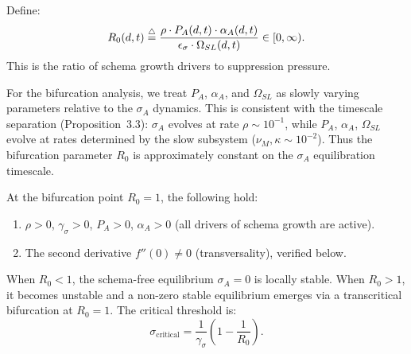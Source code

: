 
\begin{definition}
Define:
\[
R_0(d,t) \stackrel{\triangle}{=} \frac{\rho \cdot P_A(d,t) \cdot \alpha_A(d,t)}
{\epsilon_\sigma \cdot \Omega_{SL}(d,t)} \in [0, \infty).
\]
This is the ratio of schema growth drivers to suppression pressure.
\end{definition}

\begin{assumption}
For the bifurcation analysis, we treat $P_A$, $\alpha_A$, and $\Omega_{SL}$
as slowly varying parameters relative to the $\sigma_A$ dynamics. This is
consistent with the timescale separation (Proposition~3.3): $\sigma_A$
evolves at rate $\rho \sim 10^{-1}$, while $P_A$, $\alpha_A$, $\Omega_{SL}$
evolve at rates determined by the slow subsystem ($\nu_M, \kappa \sim 10^{-2}$).
Thus the bifurcation parameter $R_0$ is approximately constant on the
$\sigma_A$ equilibration timescale.
\end{assumption}

\begin{assumption}
At the bifurcation point $R_0 = 1$, the following hold:
\begin{enumerate}[nosep]
\item $\rho > 0$, $\gamma_\sigma > 0$, $P_A > 0$, $\alpha_A > 0$
  (all drivers of schema growth are active).
\item The second derivative $f''(0) \neq 0$ (transversality), verified below.
\end{enumerate}
\end{assumption}

\begin{proposition}
\label{prop:bifurcation}
When $R_0 < 1$, the schema-free equilibrium $\sigma_A = 0$ is locally
stable. When $R_0 > 1$, it becomes unstable and a non-zero stable
equilibrium emerges via a transcritical bifurcation at $R_0 = 1$.
The critical threshold is:
\[
\sigma_{\text{critical}} = \frac{1}{\gamma_\sigma}\left(1 - \frac{1}{R_0}\right).
\]
\end{proposition}

